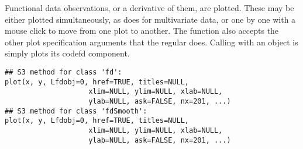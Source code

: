 \documentclass{article}
\begin{document}
\begin{Description}\relax
Functional data observations, or a derivative of them, are plotted.
These may be either plotted simultaneously, as  does for
multivariate data, or one by one with a mouse click to move from one
plot to another.  The function also accepts the other plot
specification arguments that the regular  does.  Calling
 with an  object is simply plots its
code{fd} component.
\end{Description}
\begin{Usage}
\begin{verbatim}
## S3 method for class 'fd':
plot(x, y, Lfdobj=0, href=TRUE, titles=NULL,
                    xlim=NULL, ylim=NULL, xlab=NULL,
                    ylab=NULL, ask=FALSE, nx=201, ...)
## S3 method for class 'fdSmooth':
plot(x, y, Lfdobj=0, href=TRUE, titles=NULL,
                    xlim=NULL, ylim=NULL, xlab=NULL,
                    ylab=NULL, ask=FALSE, nx=201, ...)
\end{verbatim}
\end{Usage}
\end{document}
